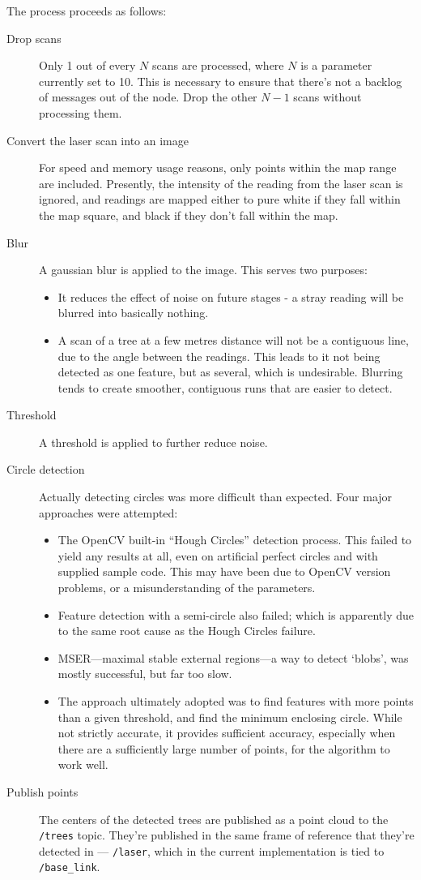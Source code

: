 \documentclass[12pt,oneside,a4paper]{book}
\begin{document}
The process proceeds as follows:
\begin{description}
\item[Drop scans] Only 1 out of every $N$ scans are processed, where
  $N$ is a parameter currently set to 10. This is necessary to ensure
  that there's not a backlog of messages out of the node. Drop the
  other $N-1$ scans without processing them.
\item[Convert the laser scan into an image] For speed and memory usage
  reasons, only points within the map range are included. Presently,
  the intensity of the reading from the laser scan is ignored, and
  readings are mapped either to pure white if they fall within the map
  square, and black if they don't fall within the map.
\item[Blur] A gaussian blur is applied to the image. This serves two
  purposes:
  \begin{itemize}
  \item It reduces the effect of noise on future stages - a stray
    reading will be blurred into basically nothing.
  \item A scan of a tree at a few metres distance will not be a
    contiguous line, due to the angle between the readings. This leads
    to it not being detected as one feature, but as several, which is
    undesirable. Blurring tends to create smoother, contiguous runs
    that are easier to detect.
  \end{itemize}
\item[Threshold] A threshold is applied to further reduce noise.
\item[Circle detection] Actually detecting circles was more difficult
  than expected. Four major approaches were attempted:
  \begin{itemize}
  \item The OpenCV built-in ``Hough Circles'' detection process. This
    failed to yield any results at all, even on artificial perfect
    circles and with supplied sample code. This may have been due to
    OpenCV version problems, or a misunderstanding of the parameters.
  \item Feature detection with a semi-circle also failed; which is
    apparently due to the same root cause as the Hough Circles
    failure.
  \item MSER---maximal stable external regions---a way to detect
    `blobs', was mostly successful, but far too slow.
  \item The approach ultimately adopted was to find features with more
    points than a given threshold, and find the minimum enclosing
    circle. While not strictly accurate, it provides sufficient
    accuracy, especially when there are a sufficiently large number of
    points, for the algorithm to work well.
  \end{itemize}
\item[Publish points] The centers of the detected trees are published
  as a point cloud to the \texttt{/trees} topic. They're published in
  the same frame of reference that they're detected in ---
  \texttt{/laser}, which in the current implementation is tied to
  \texttt{/base\_link}.
\end{description}
\end{document}
